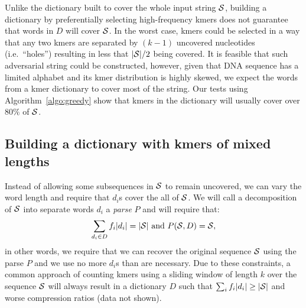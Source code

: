 \documentclass[12pt]{cmuthesis}
\makeatletter
\newcommand{\ie}{i.e.\@}
\makeatother
\begin{document}
  

  Unlike the dictionary built to cover the whole input string $\mathcal{S}$, building a dictionary by preferentially selecting high-frequency kmers does not guarantee that words in $D$ will cover $\mathcal{S}$. In the worst case, kmers could be selected in a way that any two kmers are separated by $(k-1)$ uncovered nucleotides (\ie~``holes'') resulting in less that $|\mathcal{S}| / 2$ being covered. It is feasible that such adversarial string could be constructed, however, given that DNA sequence has a limited alphabet and its kmer distribution is highly skewed, we expect the words from a kmer dictionary to cover most of the string. Our tests using Algorithm~\ref{algo:greedy} show that kmers in the dictionary will usually cover over $80\%$ of $\mathcal{S}$.

  \subsection{Building a dictionary with kmers of mixed lengths}

  Instead of allowing some subsequences in $\mathcal{S}$ to remain uncovered, we can vary the word length and require that $d_i$s cover the all of $\mathcal{S}$. We will call a decomposition of $\mathcal{S}$ into separate words $d_i$ a \textit{parse} $P$ and will require that:
  \begin{align}
  \label{eqn:constraints}
  \sum_{d_i \in D} f_i |d_i| = |\mathcal{S}|~\textrm{and}~P(\mathcal{S}, D) = \mathcal{S},
  \end{align}
  in other words, we require that we can recover the original sequence $\mathcal{S}$ using the parse $P$ and we use no more $d_i$s than are necessary.
  Due to these constraints, a common approach of counting kmers using a sliding window of length $k$ over the sequence $\mathcal{S}$ will always result in a dictionary $D$ such that $\sum_{i} f_i |d_i| \geq |\mathcal{S}|$ and worse compression ratios (data not shown).
\end{document}
